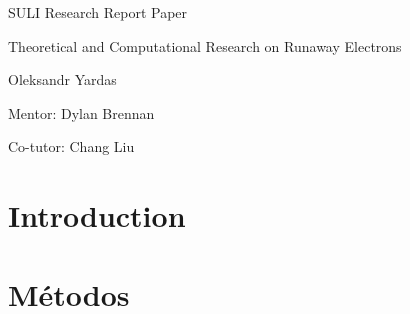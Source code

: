 \documentclass[12pt]{article}
\begin{document}
\begin{titlepage}
	\centering
	
	\vspace*{5 cm}
	{\LARGE SULI Research Report Paper}
	
	\vspace*{2 cm}
	{\Large Theoretical and Computational Research on Runaway Electrons}
	
	\vspace{2 cm}
	{\large Oleksandr Yardas}
	
	\vspace{0.5cm}
	{\large Mentor: Dylan Brennan}
	
	\vspace{0.5cm}
	{\large Co-tutor: Chang Liu}
	
\end{titlepage}
\section{Introduction}


\section{Métodos}
\end{document}
